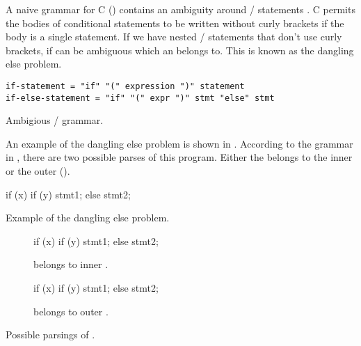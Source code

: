 \documentclass[00-main.tex]{subfiles}
\begin{document}
A naive grammar for C () contains an ambiguity around / statements .
C permits the bodies of conditional statements to be written without curly brackets if the body is a single statement.
If we have nested / statements that don't use curly brackets, if can be ambiguous which  an  belongs to. This is known as the dangling else problem.

\begin{listing}[!ht]
\begin{verbatim}
if-statement = "if" "(" expression ")" statement
if-else-statement = "if" "(" expr ")" stmt "else" stmt
\end{verbatim}
\caption{Ambigious / grammar.}
\label{lst:ambiguous if-else grammar}
\end{listing}

An example of the dangling else problem is shown in .
According to the grammar in , there are two possible parses of this program.
Either the  belongs to the inner or the outer  ().

\begin{listing}[!ht]
  \begin{CListing}
    if (x)
      if (y)
        stmt1;
    else
      stmt2;
  \end{CListing}
  \caption{Example of the dangling else problem.}
  \label{lst:dangling else}
\end{listing}

\begin{listing}[!ht]
  \begin{subfigure}[t]{0.5\textwidth}
    \begin{CListing}
      if (x) {
        if (y) {
          stmt1;
        } else {
          stmt2;
        }
      }
    \end{CListing}
    \caption{ belongs to inner .}
  \end{subfigure}
  \begin{subfigure}[t]{0.5\textwidth}
    \begin{CListing}
      if (x) {
        if (y) {
          stmt1;
        }
      } else {
        stmt2;
      }
    \end{CListing}
    \caption{ belongs to outer .}
  \end{subfigure}
  \caption{Possible parsings of .}
  \label{lst:dangling else possible parsings}
\end{listing}
\end{document}
